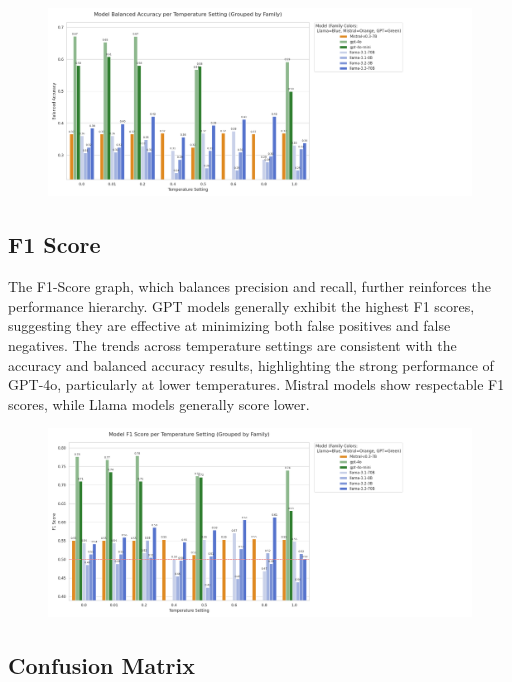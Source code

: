 \documentclass[../main.tex]{subfiles}
\begin{document}
\begin{figure}[H]
    \includegraphics[width=\textwidth]{Graphs/Balanced Accuracy.png}
\end{figure}

\subsection{F1 Score}
The F1-Score graph, which balances precision and recall, further reinforces the performance hierarchy. GPT models generally exhibit the highest F1 scores, suggesting they are effective at minimizing both false positives and false negatives. The trends across temperature settings are consistent with the accuracy and balanced accuracy results, highlighting the strong performance of GPT-4o, particularly at lower temperatures. Mistral models show respectable F1 scores, while Llama models generally score lower.

\begin{figure}[H]
    \includegraphics[width=\textwidth]{Graphs/Model f1 Scores.png}
\end{figure}

\newpage
\subsection{Confusion Matrix}
\end{document}
